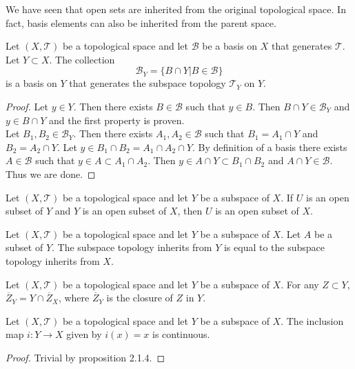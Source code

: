 \documentclass[a4paper]{article}
\begin{document}
We have seen that open sets are inherited from the original topological space. In fact, basis elements can also be inherited from the parent space. 

\begin{prp}{}{} Let $(X,\mathcal{T})$ be a topological space and let $\mathcal{B}$ be a basis on $X$ that generates $\mathcal{T}$. Let $Y\subset X$. The collection $$\mathcal{B}_Y=\{B\cap Y|B\in\mathcal{B}\}$$ is a basis on $Y$ that generates the subspace topology $\mathcal{T}_Y$ on $Y$. 
\begin{proof}
Let $y\in Y$. Then there exists $B\in\mathcal{B}$ such that $y\in B$. Then $B\cap Y\in\mathcal{B}_Y$ and $y\in B\cap Y$ and the first property is proven. \\
Let $B_1,B_2\in\mathcal{B}_Y$. Then there exists $A_1,A_2\in\mathcal{B}$ such that $B_1=A_1\cap Y$ and $B_2=A_2\cap Y$.  Let $y\in B_1\cap B_2=A_1\cap A_2\cap Y$. By definition of a basis there exists $A\in\mathcal{B}$ such that $y\in A\subset A_1\cap A_2$. Then $y\in A\cap Y\subset B_1\cap B_2$ and $A\cap Y\in\mathcal{B}$. Thus we are done. 
\end{proof}
\end{prp}

\begin{prp}{}{} Let $(X,\mathcal{T})$ be a topological space and let $Y$ be a subspace of $X$. If $U$ is an open subset of $Y$ and $Y$ is an open subset of $X$, then $U$ is an open subset of $X$. 
\end{prp}

\begin{prp}{}{} Let $(X,\mathcal{T})$ be a topological space and let $Y$ be a subspace of $X$. Let $A$ be a subset of $Y$. The subspace topology inherits from $Y$ is equal to the subspace topology inherits from $X$. 
\end{prp}

\begin{prp}{}{} Let $(X,\mathcal{T})$ be a topological space and let $Y$ be a subspace of $X$. For any $Z\subset Y$, $\overline{Z}_Y=Y\cap\overline{Z}_X$, where $\overline{Z}_Y$ is the closure of $Z$ in $Y$. 
\end{prp}

\begin{prp}{}{} Let $(X,\mathcal{T})$ be a topological space and let $Y$ be a subspace of $X$. The inclusion map $i:Y\to X$ given by $i(x)=x$ is continuous. 
\begin{proof}
Trivial by proposition 2.1.4. 
\end{proof}
\end{prp}
\end{document}
